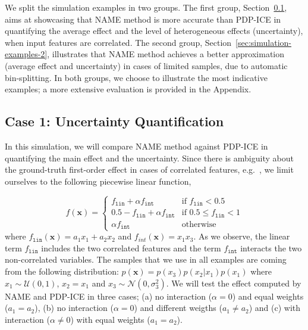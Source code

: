 \documentclass[twoside]{article}
\begin{document}
We split the simulation examples in two groups. The first group,
Section~\ref{sec:simulation-examples-1}, aims at showcasing that NAME
method is more accurate than PDP-ICE in quantifying the average effect
and the level of heterogeneous effects (uncertainty), when input
features are correlated. The second group,
Section~\ref{sec:simulation-examples-2}, illustrates that NAME method
achieves a better approximation (average effect and uncertainty) in
cases of limited samples, due to automatic bin-splitting. In both
groups, we choose to illustrate the most indicative examples; a more
extensive evaluation is provided in the Appendix.

\subsection{Case 1: Uncertainty Quantification}
\label{sec:simulation-examples-1}

In this simulation, we will compare NAME method against PDP-ICE in
quantifying the main effect and the uncertainty. Since there is
ambiguity about the ground-truth first-order effect in cases of
correlated features,
e.g.~\citep{apley2020visualizing,Gromping2020MAEP}, we limit ourselves
to the following piecewise linear function,

\begin{equation}
  \label{eq:synth-ex-1-function}
  f(\mathbf{x}) = \begin{cases}
                    f_{\mathtt{lin}} + \alpha f_{\mathtt{int}} & \text{if $f_{\mathtt{lin}} < 0.5$ }\\
                    0.5 - f_{\mathtt{lin}} + \alpha f_{\mathtt{int}} & \text{if $0.5 \leq f_{\mathtt{lin}} < 1$}\\
                    \alpha f_{\mathtt{int}} &\text{otherwise}
                  \end{cases}
\end{equation}
%
where \(f_{\mathtt{lin}}(\mathbf{x}) = a_1 x_1 + a_2 x_2\) and
\(f_{int}(\mathbf{x}) = x_1x_3\). As we observe, the linear term
\(f_{\mathtt{lin}}\) includes the two correlated features and the term
\(f_{\mathtt{int}}\) interacts the two non-correlated variables. The
samples that we use in all examples are coming from the following
distribution: \(p(\mathbf{x}) = p(x_3)p(x_2|x_1)p(x_1)\) where
\(x_1 \sim \mathcal{U}(0,1)\), \(x_2 = x_1\) and
\(x_3 \sim \mathcal{N}(0, \sigma_3^2)\). We will test the effect
computed by NAME and PDP-ICE in three cases; (a) no interaction
(\(\alpha=0\)) and equal weights (\(a_1=a_2\)), (b) no interaction
(\(\alpha=0\)) and different weigths (\( a_1 \neq a_2 \)) and (c) with
interaction (\(\alpha \neq 0\)) with equal weights (\(a_1=a_2\)).
\end{document}
